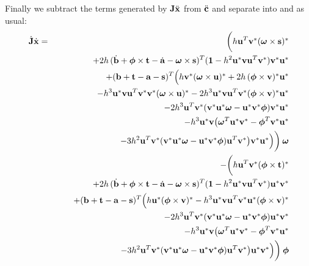 Finally we subtract the terms generated by $\m{J}\ddot{\ve{x}}$ from $\ddot{\ve{c}}$ and separate
into \ve{\omega} and \ve{\lambda} as usual:
\begin{eqnarray}
\dot{\m{J}}\dot{\ve{x}} &=& \bigg(
        h\ve{u}^T\dual{\ve{v}}\dual{(\ve{\omega}\times\ve{s})} \\*&&\quad\quad +
        2h\,(\dot{\ve{b}} + \ve{\phi}\times\ve{t} - \dot{\ve{a}} - \ve{\omega}\times\ve{s})^T
        (\m{1} - h^2\dual{\ve{u}}\ve{v}\ve{u}^T\dual{\ve{v}}) \dual{\ve{v}}\dual{\ve{u}}
        \nonumber\\*&&\quad\quad
        +(\ve{b} + \ve{t} - \ve{a} - \ve{s})^T \Big(
        h\dual{\ve{v}}\dual{(\ve{\omega}\times\ve{u})}
        +2h\,\dual{(\ve{\phi}\times\ve{v})}\dual{\ve{u}} \nonumber\\*&&\quad\quad\quad\quad
        -h^3\dual{\ve{u}}\ve{v}\ve{u}^T\dual{\ve{v}}\dual{\ve{v}}\dual{(\ve{\omega}\times\ve{u})}
        -2h^3\dual{\ve{u}}\ve{v}\ve{u}^T\dual{\ve{v}}\dual{(\ve{\phi}\times\ve{v})}\dual{\ve{u}}
        \nonumber\\*&&\quad\quad\quad\quad
        -2h^3 \ve{u}^T\dual{\ve{v}} (\dual{\ve{v}}\dual{\ve{u}}\ve{\omega} -
        \dual{\ve{u}}\dual{\ve{v}}\ve{\phi}) \dual{\ve{v}}\dual{\ve{u}}
        \nonumber\\*&&\quad\quad\quad\quad
        -h^3 \dual{\ve{u}}\ve{v} \big(
        \ve{\omega}^T\dual{\ve{u}}\dual{\ve{v}} - \ve{\phi}^T\dual{\ve{v}}\dual{\ve{u}}
        \nonumber\\*&&\quad\quad\quad\quad\quad\quad
        -3h^2 \ve{u}^T\dual{\ve{v}}
        (\dual{\ve{v}}\dual{\ve{u}}\ve{\omega} - \dual{\ve{u}}\dual{\ve{v}}\ve{\phi})
        \ve{u}^T\dual{\ve{v}} \big) \dual{\ve{v}}\dual{\ve{u}} \Big) \bigg)\: \ve{\omega}
        \nonumber\\*&&
        -\bigg(
        h\ve{u}^T\dual{\ve{v}}\dual{(\ve{\phi}\times\ve{t})} \nonumber\\*&&\quad\quad
        +2h\,(\dot{\ve{b}} + \ve{\phi}\times\ve{t} - \dot{\ve{a}} - \ve{\omega}\times\ve{s})^T
        (\m{1} - h^2\dual{\ve{u}}\ve{v}\ve{u}^T\dual{\ve{v}}) \dual{\ve{u}}\dual{\ve{v}}
        \nonumber\\*&&\quad\quad
        +(\ve{b} + \ve{t} - \ve{a} - \ve{s})^T \Big(
        h\dual{\ve{u}}\dual{(\ve{\phi}\times\ve{v})}
        -h^3\dual{\ve{u}}\ve{v}\ve{u}^T\dual{\ve{v}}\dual{\ve{u}}\dual{(\ve{\phi}\times\ve{v})}
        \nonumber\\*&&\quad\quad\quad\quad
        -2h^3 \ve{u}^T\dual{\ve{v}} (\dual{\ve{v}}\dual{\ve{u}}\ve{\omega} -
        \dual{\ve{u}}\dual{\ve{v}}\ve{\phi}) \dual{\ve{u}}\dual{\ve{v}}
        \nonumber\\*&&\quad\quad\quad\quad
        -h^3 \dual{\ve{u}}\ve{v} \big(
        \ve{\omega}^T\dual{\ve{u}}\dual{\ve{v}} - \ve{\phi}^T\dual{\ve{v}}\dual{\ve{u}}
        \nonumber\\*&&\quad\quad\quad\quad\quad\quad
        -3h^2 \ve{u}^T\dual{\ve{v}}
        (\dual{\ve{v}}\dual{\ve{u}}\ve{\omega} - \dual{\ve{u}}\dual{\ve{v}}\ve{\phi})
        \ve{u}^T\dual{\ve{v}}
        \big) \dual{\ve{u}}\dual{\ve{v}} \Big) \bigg)\: \ve{\phi} \nonumber
\end{eqnarray}
